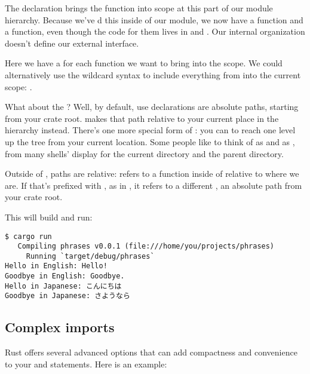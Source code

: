 The  declaration brings the function into scope at this part of our module hierarchy. Because we've d this 
inside of our  module, we now have a  function and a 
function, even though the code for them lives in  and .
Our internal organization doesn't define our external interface.

\blank

Here we have a  for each function we want to bring into the  scope. We could alternatively use the wildcard 
syntax to include everything from  into the current scope: .

\blank

What about the ? Well, by default, use declarations are absolute paths, starting from your crate root.  makes that 
path relative to your current place in the hierarchy instead. There's one more special form of : you can  to 
reach one level up the tree from your current location. Some people like to think of  as  and  as , 
from many shells' display for the current directory and the parent directory.

\blank

Outside of , paths are relative:  refers to a function inside of  relative to where we are. If 
that's prefixed with \code{::}, as in , it refers to a different , an absolute path from your crate root.

\blank

This will build and run:

\begin{verbatim}
$ cargo run
   Compiling phrases v0.0.1 (file:///home/you/projects/phrases)
     Running `target/debug/phrases`
Hello in English: Hello!
Goodbye in English: Goodbye.
Hello in Japanese: こんにちは
Goodbye in Japanese: さようなら
\end{verbatim}

\subsection*{Complex imports}

Rust offers several advanced options that can add compactness and convenience to your  and  statements. 
Here is an example:

